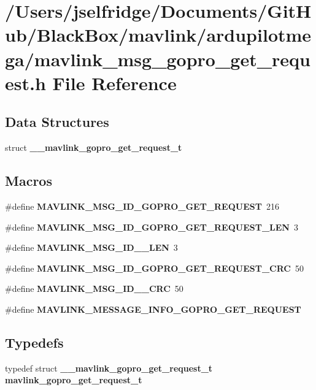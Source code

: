 \section{/\+Users/jselfridge/\+Documents/\+Git\+Hub/\+Black\+Box/mavlink/ardupilotmega/mavlink\+\_\+msg\+\_\+gopro\+\_\+get\+\_\+request.h File Reference}
\label{mavlink__msg__gopro__get__request_8h}
\subsection*{Data Structures}
\begin{DoxyCompactItemize}
\item 
struct \textbf{ \+\_\+\+\_\+mavlink\+\_\+gopro\+\_\+get\+\_\+request\+\_\+t}
\end{DoxyCompactItemize}
\subsection*{Macros}
\begin{DoxyCompactItemize}
\item 
\#define \textbf{ M\+A\+V\+L\+I\+N\+K\+\_\+\+M\+S\+G\+\_\+\+I\+D\+\_\+\+G\+O\+P\+R\+O\+\_\+\+G\+E\+T\+\_\+\+R\+E\+Q\+U\+E\+ST}~216
\item 
\#define \textbf{ M\+A\+V\+L\+I\+N\+K\+\_\+\+M\+S\+G\+\_\+\+I\+D\+\_\+\+G\+O\+P\+R\+O\+\_\+\+G\+E\+T\+\_\+\+R\+E\+Q\+U\+E\+S\+T\+\_\+\+L\+EN}~3
\item 
\#define \textbf{ M\+A\+V\+L\+I\+N\+K\+\_\+\+M\+S\+G\+\_\+\+I\+D\+\_\+\_\+\+L\+EN}~3
\item 
\#define \textbf{ M\+A\+V\+L\+I\+N\+K\+\_\+\+M\+S\+G\+\_\+\+I\+D\+\_\+\+G\+O\+P\+R\+O\+\_\+\+G\+E\+T\+\_\+\+R\+E\+Q\+U\+E\+S\+T\+\_\+\+C\+RC}~50
\item 
\#define \textbf{ M\+A\+V\+L\+I\+N\+K\+\_\+\+M\+S\+G\+\_\+\+I\+D\+\_\+\_\+\+C\+RC}~50
\item 
\#define \textbf{ M\+A\+V\+L\+I\+N\+K\+\_\+\+M\+E\+S\+S\+A\+G\+E\+\_\+\+I\+N\+F\+O\+\_\+\+G\+O\+P\+R\+O\+\_\+\+G\+E\+T\+\_\+\+R\+E\+Q\+U\+E\+ST}
\end{DoxyCompactItemize}
\subsection*{Typedefs}
\begin{DoxyCompactItemize}
\item 
typedef struct \textbf{ \+\_\+\+\_\+mavlink\+\_\+gopro\+\_\+get\+\_\+request\+\_\+t} \textbf{ mavlink\+\_\+gopro\+\_\+get\+\_\+request\+\_\+t}
\end{DoxyCompactItemize}


